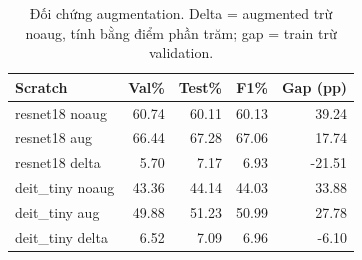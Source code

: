 \begin{table}[htbp]
\centering\small
\caption{Đối chứng augmentation. Delta = augmented trừ noaug, tính bằng điểm phần trăm; gap = train trừ validation.}\label{tab:A1ablation}
\begin{lrbox}{\reporttable}\begin{tabular}{lrrrr}
\toprule
Scratch & Val\% & Test\% & F1\% & Gap (pp) \\
\midrule
resnet18 noaug & 60.74 & 60.11 & 60.13 & 39.24 \\
resnet18 aug & 66.44 & 67.28 & 67.06 & 17.74 \\
resnet18 delta & 5.70 & 7.17 & 6.93 & -21.51 \\
deit\_tiny noaug & 43.36 & 44.14 & 44.03 & 33.88 \\
deit\_tiny aug & 49.88 & 51.23 & 50.99 & 27.78 \\
deit\_tiny delta & 6.52 & 7.09 & 6.96 & -6.10 \\
\bottomrule
\end{tabular}\end{lrbox}
\ifdim\wd\reporttable>\linewidth\resizebox{\linewidth}{!}{\usebox{\reporttable}}\else\usebox{\reporttable}\fi
\end{table}
